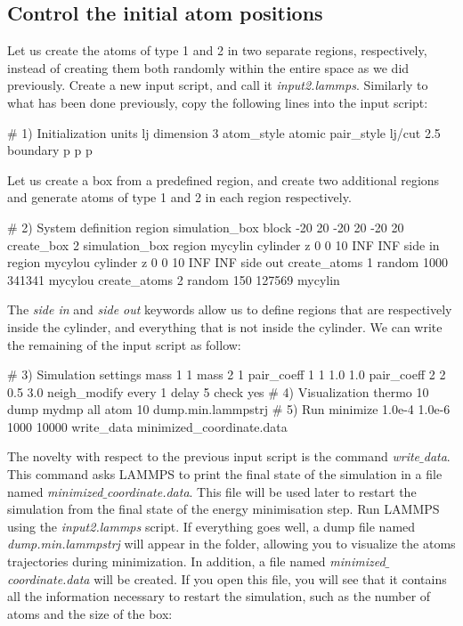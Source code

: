 \noindent \subsection{Control the initial atom positions}

Let us create the atoms of type 1 and 2 in two separate
regions, respectively, instead of creating them both randomly 
within the entire space as we did previously. Create a new input script, and call
it \textit{input2.lammps}. Similarly to what has been done previously, copy the following lines
into the input script:

\begin{lcverbatim}
# 1) Initialization
units lj
dimension 3
atom_style atomic
pair_style lj/cut 2.5
boundary p p p
\end{lcverbatim}

\noindent Let us create a box from a predefined region,
and create two additional regions and generate
atoms of type 1 and 2 in each region respectively.

\begin{lcverbatim}
# 2) System definition
region simulation_box block -20 20 -20 20 -20 20
create_box 2 simulation_box
region mycylin cylinder z 0 0 10 INF INF side in
region mycylou cylinder z 0 0 10 INF INF side out
create_atoms 1 random 1000 341341 mycylou
create_atoms 2 random 150 127569 mycylin
\end{lcverbatim}

\noindent The \textit{side in} and \textit{side out} keywords
allow us to define regions that are respectively inside the
cylinder, and everything that is not inside the cylinder.
We can write the remaining of the input script as follow:

\begin{lcverbatim}
# 3) Simulation settings
mass 1 1
mass 2 1
pair_coeff 1 1 1.0 1.0
pair_coeff 2 2 0.5 3.0
neigh_modify every 1 delay 5 check yes
# 4) Visualization
thermo 10
dump mydmp all atom 10 dump.min.lammpstrj
# 5) Run
minimize 1.0e-4 1.0e-6 1000 10000
write_data minimized_coordinate.data
\end{lcverbatim}

\noindent The novelty with respect to the previous
input script is the command \textit{write$\_$data}. This command
asks LAMMPS to print the final state of the simulation in
a file named \textit{minimized$\_$coordinate.data}. This file will
be used later to restart the simulation from the final
state of the energy minimisation step.
Run LAMMPS using the \textit{input2.lammps} script. If everything
goes well, a dump file named \textit{dump.min.lammpstrj} will
appear in the folder, allowing you to visualize the atoms
trajectories during minimization. In
addition, a file named \textit{minimized$\_$coordinate.data} will be
created. If you open this file, you will see that it
contains all the information necessary to restart the
simulation, such as the number of atoms and the size of
the box:

